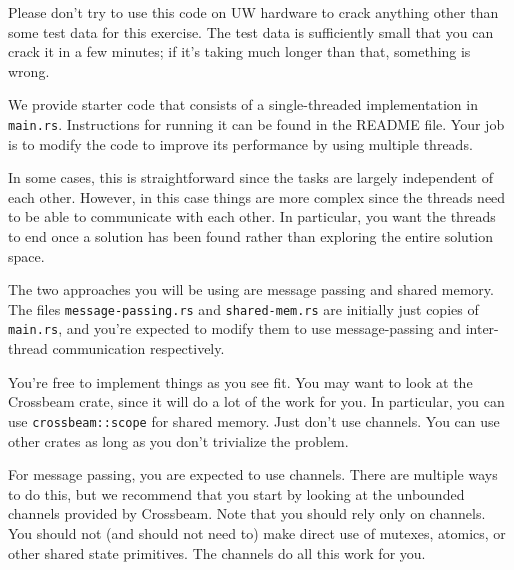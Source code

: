 \documentclass[12pt]{article}
\renewcommand{\_}{\kern-1.5pt\textunderscore\kern-1.5pt}
\begin{document}
\vspace*{1em} \noindent
  Please don’t try to use this code on UW hardware to crack anything other than some test data for this exercise. The test data is sufficiently small that you can crack it in a few minutes; if it’s taking much longer than that, something is wrong. \par

\vspace*{1em} \noindent
We provide starter code that consists of a single-threaded implementation in {\tt main.rs}. Instructions for running it can be found in the README file. Your job is to modify the code to improve its performance by using multiple threads.\par

\vspace*{1em} \noindent
In some cases, this is straightforward since the tasks are largely independent of each other. However, in this case things are more complex since the threads need to be able to communicate with each other. In particular, you want the threads to end once a solution has been found rather than exploring the entire solution space.\par

\vspace*{1em} \noindent
The two approaches you will be using are message passing and shared memory. The files {\tt message-passing.rs} and {\tt shared-mem.rs} are initially just copies of {\tt main.rs}, and you're expected to modify them to use message-passing and inter-thread communication respectively.\par

\vspace*{1em} \noindent
You're free to implement things as you see fit. You may want to look at the Crossbeam crate, since it will do a lot of the work for you. In particular, you can use {\tt crossbeam::scope} for shared memory. Just don't use channels. You can use other crates as long as you don't trivialize the problem.

\vspace*{1em} \noindent
For message passing, you are expected to use channels. There are multiple ways to do this, but we recommend that you start by looking at the unbounded channels provided by Crossbeam. Note that you should rely only on channels. You should not (and should not need to) make direct use of mutexes, atomics, or other shared state primitives. The channels do all this work for you.\par
\end{document}
